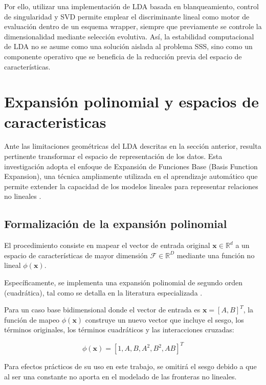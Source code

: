 Por ello, utilizar una implementación de LDA basada en blanqueamiento, control de singularidad y SVD permite emplear el discriminante lineal como motor de evaluación dentro de un esquema wrapper, siempre que previamente se controle la dimensionalidad mediante selección evolutiva. Así, la estabilidad computacional de LDA no se asume como una solución aislada al problema SSS, sino como un componente operativo que se beneficia de la reducción previa del espacio de características.


\section{Expansión polinomial y espacios de caracteristicas}

Ante las limitaciones geométricas del LDA descritas en la sección anterior, resulta pertinente transformar el espacio de representación de los datos. Esta investigación adopta el enfoque de Expansión de Funciones Base (Basis Function Expansion), una técnica ampliamente utilizada en el aprendizaje automático que permite extender la capacidad de los modelos lineales para representar relaciones no lineales \cite{bishop2006pattern}.

\subsection{Formalización de la expansión polinomial}

El procedimiento consiste en mapear el vector de entrada original $\mathbf{x} \in \mathbb{R}^d$ a un espacio de características de mayor dimensión $\mathcal{F} \in \mathbb{R}^D$ mediante una función no lineal $\phi(\mathbf{x})$.

Específicamente, se implementa una expansión polinomial de segundo orden (cuadrática), tal como se detalla en la literatura especializada \cite{Murphy2012,niu2021local}.

Para un caso base bidimensional donde el vector de entrada es $\mathbf{x} = [A,B]^T$, la función de mapeo $\phi(\mathbf{x})$ construye un nuevo vector que incluye el sesgo, los términos originales, los términos cuadráticos y las interacciones cruzadas:

\begin{equation}
	\phi(\mathbf{x}) = [1,A,B,A^2,B^2,AB]^T
	\label{eq:EMT12}
\end{equation}

Para efectos prácticos de su uso en este trabajo, se omitirá el sesgo debido a que al ser una constante no aporta en el modelado de las fronteras no lineales.

